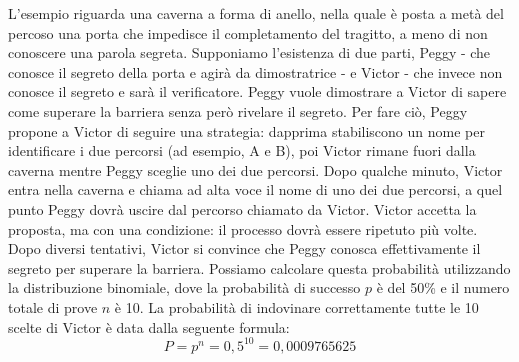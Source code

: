 L’esempio riguarda una caverna a forma di anello, nella quale è posta a metà del percoso una porta che impedisce il
completamento del tragitto, a meno di non conoscere una parola segreta. Supponiamo l'esistenza di due parti, Peggy - che
conosce il segreto della porta e agirà da dimostratrice - e Victor - che invece non conosce il segreto e sarà il
verificatore. Peggy vuole dimostrare a Victor di sapere come superare la barriera senza però rivelare il segreto. Per
fare ciò, Peggy propone a Victor di seguire una strategia: dapprima stabiliscono un nome per identificare i due percorsi
(ad esempio, A e B), poi Victor rimane fuori dalla caverna mentre Peggy sceglie uno dei due percorsi. Dopo qualche
minuto, Victor entra nella caverna e chiama ad alta voce il nome di uno dei due percorsi, a quel punto Peggy dovrà
uscire dal percorso chiamato da Victor. Victor accetta la proposta, ma con una condizione: il processo dovrà essere
ripetuto più volte. Dopo diversi tentativi, Victor si convince che Peggy conosca effettivamente il segreto per superare
la barriera. Possiamo calcolare questa probabilità utilizzando la distribuzione binomiale, dove la probabilità di
successo \( p \) è del 50\% e il numero totale di prove \( n \) è 10. La probabilità di indovinare correttamente tutte le 10 scelte
di Victor è data dalla seguente formula: \[ P = p^n = 0,5^{10} = 0,0009765625 \]